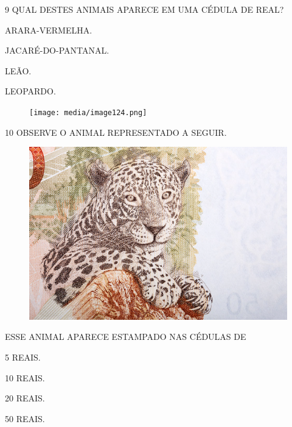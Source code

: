 \num{9} QUAL DESTES ANIMAIS APARECE EM UMA CÉDULA DE REAL?

\begin{escolha}[itemsep=0pt]
\item ARARA-VERMELHA.

\item JACARÉ-DO-PANTANAL.

\item LEÃO.

\item LEOPARDO.
\end{escolha}

\begin{figure}[H]
\centering
\texttt{[image: media/image124.png]}
\end{figure}

\pagebreak
\num{10} OBSERVE O ANIMAL REPRESENTADO A SEGUIR.\bigskip

\begin{minipage}{.6\textwidth}
\begin{figure}[H]
\centering
\includegraphics[width=\textwidth]{./media/SAEB_1ANO_MAT_FIGURA140.png}
\end{figure}
\end{minipage}
\hspace{0.5cm}
ESSE ANIMAL APARECE ESTAMPADO NAS CÉDULAS DE

\begin{escolha}%
\item 5 REAIS.

\item 10 REAIS.

\item 20 REAIS.

\item 50 REAIS.
\end{escolha}


